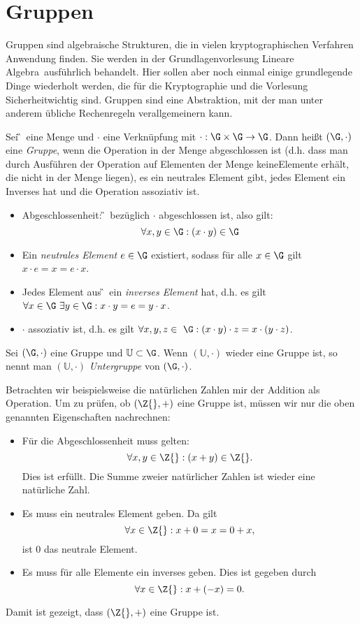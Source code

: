 
\chapter{Gruppen}
Gruppen sind algebraische Strukturen, die in vielen kryptographischen
Verfahren Anwendung finden. Sie werden in der Grundlagenvorlesung
\glqq Lineare Algebra\grqq~ausführlich behandelt. Hier sollen aber noch einmal
einige grundlegende Dinge wiederholt werden, die für die Kryptographie
und die Vorlesung \glqq Sicherheit\grqq wichtig sind. Gruppen sind eine
Abstraktion, mit der man unter anderem übliche Rechenregeln
verallgemeinern kann. 

\begin{definition}[Gruppe]
Sei \G~eine Menge und $\cdot$ eine Verknüpfung mit $\cdot: \G\times \G \to
\G$. Dann heißt $(\G, \cdot)$ eine \textit{Gruppe}, wenn die Operation
in der Menge abgeschlossen ist (d.h. dass man durch Ausführen der
Operation auf Elementen der Menge keineElemente erhält, die nicht in der
Menge liegen), es ein neutrales Element gibt, jedes 
Element ein Inverses hat und die Operation assoziativ ist.
\begin{itemize}
\item Abgeschlossenheit: \G~bezüglich $\cdot$ abgeschlossen ist, also gilt:
  \[\forall x, y \in \G: (x\cdot y)\in \G\]
\item Ein \textit{neutrales Element}  $e \in \G$ existiert, sodass für
  alle $x \in \G$ gilt 
  $x\cdot e=x=e\cdot x$.
\item Jedes Element aus \G~ein \textit{inverses Element} hat, d.h. es gilt $\forall x \in
  \G~ \exists y \in \G: x\cdot y=e=y\cdot x$.
\item $\cdot$ assoziativ ist,  d.h. es gilt $\forall x, y, z  \in ~\G:
  (x\cdot y)\cdot z = x\cdot(y \cdot z)$.
\end{itemize}
\end{definition}
\begin{definition}[Untergruppe]
  Sei $(\G, \cdot)$ eine Gruppe und $\mathbb{U} \subset \G$. Wenn
  $(\mathbb{U}, \cdot)$ wieder eine Gruppe ist, so nennt man $(\mathbb{U},
  \cdot)$ \textit{Untergruppe} von $(\G, \cdot)$.
\end{definition}


\begin{beispiel}
  Betrachten wir beispielsweise die natürlichen Zahlen mir der Addition
  als Operation. Um zu prüfen, ob \((\Z{}, +)\) eine Gruppe ist, müssen
  wir nur die oben genannten Eigenschaften nachrechnen:
  \begin{itemize}
  \item Für die Abgeschlossenheit muss gelten: 
    \[\forall x, y \in \Z{}: (x+y)\in \Z{}. \] 
     Dies ist erfüllt. Die Summe zweier natürlicher Zahlen ist wieder
     eine natürliche Zahl.
  \item Es muss ein neutrales Element geben. Da gilt 
    \[\forall x \in \Z{}: x+0 = x = 0+x, \] ist $0$ das neutrale Element.
  \item Es muss für alle Elemente ein inverses geben. Dies ist gegeben
    durch \[\forall x \in \Z{}: x + (-x) = 0.\]
  \end{itemize}
  Damit ist gezeigt, dass $(\Z{}, +)$ eine Gruppe ist.
\end{beispiel}


